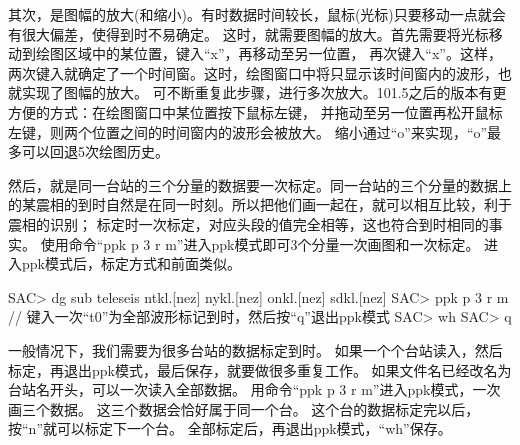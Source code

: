其次，是图幅的放大(和缩小)。有时数据时间较长，鼠标(光标)只要移动一点就会有很大偏差，使得到时不易确定。
这时，就需要图幅的放大。首先需要将光标移动到绘图区域中的某位置，键入``x''，再移动至另一位置，
再次键入``x''。这样，两次键入就确定了一个时间窗。这时，绘图窗口中将只显示该时间窗内的波形，也就实现了图幅的放大。
可不断重复此步骤，进行多次放大。101.5之后的版本有更方便的方式：在绘图窗口中某位置按下鼠标左键，
并拖动至另一位置再松开鼠标左键，则两个位置之间的时间窗内的波形会被放大。
缩小通过``o''来实现，``o''最多可以回退5次绘图历史。

然后，就是同一台站的三个分量的数据要一次标定。同一台站的三个分量的数据上的某震相的到时自然是在同一时刻。所以把他们画一起在，就可以相互比较，利于震相的识别；
标定时一次标定，对应头段的值完全相等，这也符合到时相同的事实。
使用命令``ppk p 3 r m''进入ppk模式即可3个分量一次画图和一次标定。
进入ppk模式后，标定方式和前面类似。

\begin{SACCode}
SAC> dg sub teleseis ntkl.[nez] nykl.[nez] onkl.[nez] sdkl.[nez]
SAC> ppk p 3 r m
// 键入一次``t0''为全部波形标记到时，然后按``q''退出ppk模式
SAC> wh
SAC> q
\end{SACCode}

一般情况下，我们需要为很多台站的数据标定到时。
如果一个个台站读入，然后标定，再退出ppk模式，最后保存，就要做很多重复工作。
如果文件名已经改名为台站名开头，可以一次读入全部数据。
用命令``ppk p 3 r m''进入ppk模式，一次画三个数据。
这三个数据会恰好属于同一个台。
这个台的数据标定完以后，按``n''就可以标定下一个台。
全部标定后，再退出ppk模式，``wh''保存。

